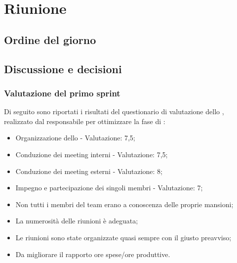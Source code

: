 \section{Riunione}
\subsection{Ordine del giorno}

\subsection{Discussione e decisioni}

\subsubsection{Valutazione del primo sprint}
\par Di seguito sono riportati i risultati del questionario di valutazione dello , realizzato dal responsabile per ottimizzare la fase di :
\begin{itemize}
  \item Organizzazione dello  - Valutazione: 7,5;
  \item Conduzione dei meeting interni - Valutazione: 7,5;
  \item Conduzione dei meeting esterni - Valutazione: 8;
  \item Impegno e partecipazione dei singoli membri - Valutazione: 7;
  \item Non tutti i membri del team erano a conoscenza delle proprie mansioni;
  \item La numerosità delle riunioni è adeguata;
  \item Le riunioni sono state organizzate quasi sempre con il giusto preavviso;
  \item Da migliorare il rapporto ore spese/ore produttive.
\end{itemize}

